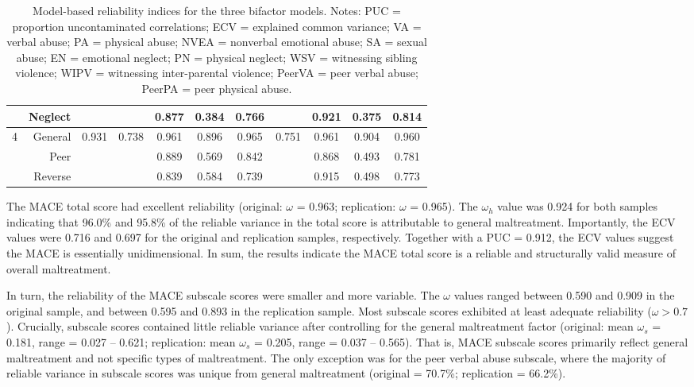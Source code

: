 \documentclass[letterpaper,man,natbib,longtable,floatsintext,12pt]{apa6}
\begin{document}
\begin{table}[t!]
\begin{tabular*}{\textwidth}{crccccccccc}
& Neglect   &        &       &  0.877 &   0.384 &  0.766 &       & 0.921 & 0.375 & 0.814 \\
\midrule
4 & General &  0.931 & 0.738 &  0.961 &   0.896 &  0.965 & 0.751 & 0.961 & 0.904 & 0.960 \\
& Peer      &        &       &  0.889 &   0.569 &  0.842 &       & 0.868 & 0.493 & 0.781 \\
& Reverse   &        &       &  0.839 &   0.584 &  0.739 &       & 0.915 & 0.498 & 0.773 \\
\bottomrule
\end{tabular*}
\captionsetup{width=1.\textwidth}
\caption{\normalfont Model-based reliability indices for the three bifactor models. Notes: PUC = proportion uncontaminated correlations; ECV = explained common variance; VA = verbal abuse; PA = physical abuse; NVEA = nonverbal emotional abuse; SA = sexual abuse; EN = emotional neglect; PN = physical neglect; WSV = witnessing sibling violence; WIPV = witnessing inter-parental violence; PeerVA = peer verbal abuse; PeerPA = peer physical abuse.}
\label{table:reliability}
\end{table}

The MACE total score had excellent reliability (original: $\omega$ = 0.963; replication: $\omega$ = 0.965). The $\omega_h$ value was 0.924 for both samples indicating that 96.0\% and 95.8\% of the reliable variance in the total score is attributable to general maltreatment. Importantly, the ECV values were 0.716 and 0.697 for the original and replication samples, respectively. Together with a PUC = 0.912, the ECV values suggest the MACE is essentially unidimensional. In sum, the results indicate the MACE total score is a reliable and structurally valid measure of overall maltreatment.

In turn, the reliability of the MACE subscale scores were smaller and more variable. The $\omega$ values ranged between 0.590 and 0.909 in the original sample, and between 0.595 and 0.893 in the replication sample. Most subscale scores exhibited at least adequate reliability ($\omega > 0.7$). Crucially, subscale scores contained little reliable variance after controlling for the general maltreatment factor (original: mean $\omega_s$ = 0.181, range = 0.027 -- 0.621; replication: mean $\omega_s$ = 0.205, range = 0.037 -- 0.565). That is, MACE subscale scores primarily reflect general maltreatment and not specific types of maltreatment. The only exception was for the peer verbal abuse subscale, where the majority of reliable variance in subscale scores was unique from general maltreatment (original = 70.7\%; replication = 66.2\%).
\end{document}
